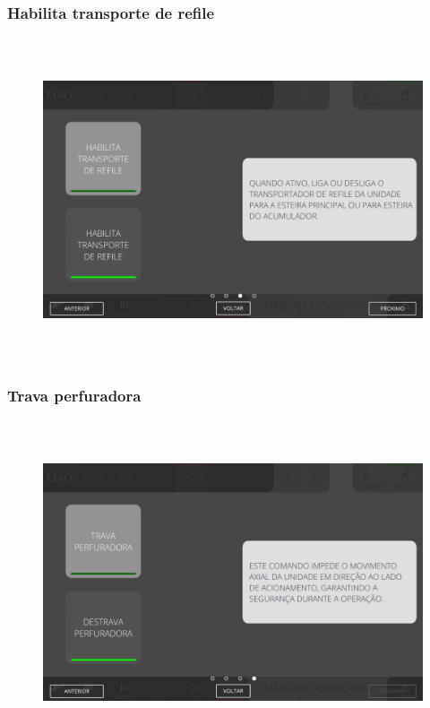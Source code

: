 \newpage
\thispagestyle{fancy}
\vspace*{40 pt}
\subsubsection{\small{Habilita transporte de refile}}\label{telaComandoPerfuradoraHabilitaTransporteRefile}
\vspace*{\fill}
\begin{figure}[h]
  \centering
  \includegraphics[width=576px,height=360px]{src/imagesFlexo/06-drilling/commands/e-3.png}
\end{figure}
\vspace*{\fill}

\newpage
\thispagestyle{fancy}
\vspace*{40 pt}
\subsubsection{\small{Trava perfuradora}}\label{telaComandoPerfuradoraTravaPerfuradora}
\vspace*{\fill}
\begin{figure}[h]
  \centering
  \includegraphics[width=576px,height=360px]{src/imagesFlexo/06-drilling/commands/e-4.png}
\end{figure}
\vspace*{\fill}
